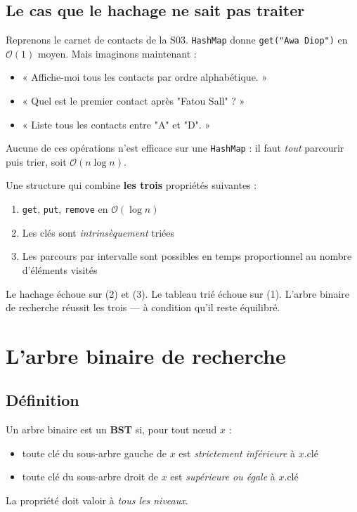 \documentclass[11pt,a4paper]{article}
\newcommand{\bigO}{\mathcal{O}}
\begin{document}
\subsection{Le cas que le hachage ne sait pas traiter}

Reprenons le carnet de contacts de la S03. \texttt{HashMap} donne \texttt{get("Awa Diop")} en $\bigO(1)$ moyen. Mais imaginons maintenant :
\begin{itemize}[nosep]
    \item « Affiche-moi tous les contacts par ordre alphabétique. »
    \item « Quel est le premier contact après "Fatou Sall" ? »
    \item « Liste tous les contacts entre "A" et "D". »
\end{itemize}

Aucune de ces opérations n'est efficace sur une \texttt{HashMap} : il faut \emph{tout} parcourir puis trier, soit $\bigO(n \log n)$.

\begin{attentionbox}[Ce qu'on cherche]
Une structure qui combine \textbf{les trois} propriétés suivantes :
\begin{enumerate}[nosep]
    \item \texttt{get}, \texttt{put}, \texttt{remove} en $\bigO(\log n)$
    \item Les clés sont \emph{intrinsèquement} triées
    \item Les parcours par intervalle sont possibles en temps proportionnel au nombre d'éléments visités
\end{enumerate}
Le hachage échoue sur (2) et (3). Le tableau trié échoue sur (1). L'arbre binaire de recherche réussit les trois --- à condition qu'il reste équilibré.
\end{attentionbox}

\section{L'arbre binaire de recherche}

\subsection{Définition}

\begin{infobox}
Un arbre binaire est un \textbf{BST} si, pour tout nœud $x$ :
\begin{itemize}[nosep]
    \item toute clé du sous-arbre gauche de $x$ est \emph{strictement inférieure} à $x.\text{clé}$
    \item toute clé du sous-arbre droit de $x$ est \emph{supérieure ou égale} à $x.\text{clé}$
\end{itemize}
La propriété doit valoir à \emph{tous les niveaux}.
\end{infobox}
\end{document}
